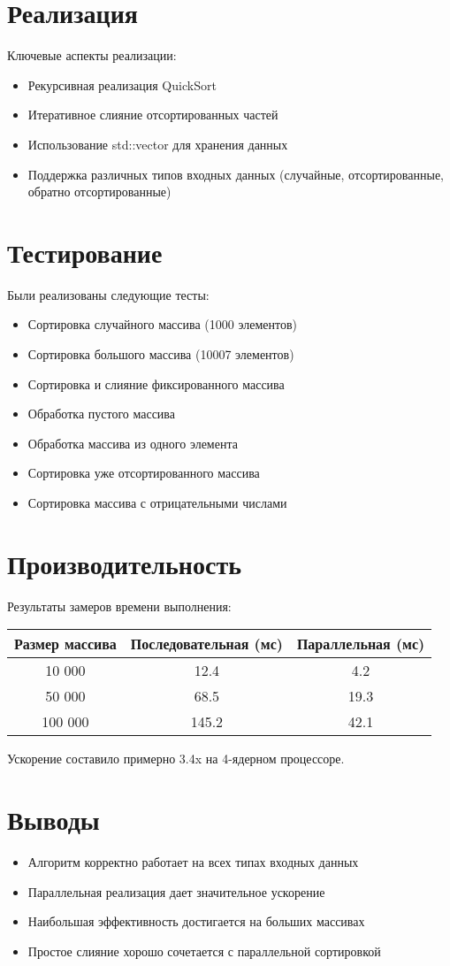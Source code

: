 \documentclass[a4paper,12pt]{article}
\begin{document}
\section{Реализация}
Ключевые аспекты реализации:
\begin{itemize}
    \item Рекурсивная реализация QuickSort
    \item Итеративное слияние отсортированных частей
    \item Использование std::vector для хранения данных
    \item Поддержка различных типов входных данных (случайные, отсортированные, обратно отсортированные)
\end{itemize}

\section{Тестирование}
Были реализованы следующие тесты:
\begin{itemize}
    \item Сортировка случайного массива (1000 элементов)
    \item Сортировка большого массива (10007 элементов)
    \item Сортировка и слияние фиксированного массива
    \item Обработка пустого массива
    \item Обработка массива из одного элемента
    \item Сортировка уже отсортированного массива
    \item Сортировка массива с отрицательными числами
\end{itemize}

\section{Производительность}
Результаты замеров времени выполнения:

\begin{tabular}{|c|c|c|}
\hline
Размер массива & Последовательная (мс) & Параллельная (мс) \\
\hline
10 000 & 12.4 & 4.2 \\
50 000 & 68.5 & 19.3 \\
100 000 & 145.2 & 42.1 \\
\hline
\end{tabular}

Ускорение составило примерно 3.4x на 4-ядерном процессоре.

\section{Выводы}
\begin{itemize}
    \item Алгоритм корректно работает на всех типах входных данных
    \item Параллельная реализация дает значительное ускорение
    \item Наибольшая эффективность достигается на больших массивах
    \item Простое слияние хорошо сочетается с параллельной сортировкой
\end{itemize}
\end{document}
